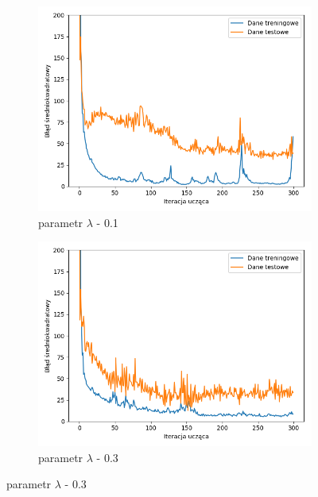 \documentclass[12pt]{aghdpl}
\begin{document}
		\begin{figure}[h]
			\begin{subfigure}{.5\linewidth}
		 		\includegraphics[width =\linewidth]{wykresy/6_regularyzacja/l1/regularyzacja_0_1_wykres_uczenia.png}
		 		\caption{parametr $\lambda$ - 0.1}
		 	\end{subfigure}
		 	\begin{subfigure}{.5\linewidth}
		 		\includegraphics[width =\linewidth]{wykresy/6_regularyzacja/l1/regularyzacja_0_3_wykres_uczenia.png}
		 		\caption{parametr $\lambda$ - 0.3}
		 	\end{subfigure}
		 	

\end{figure}
\end{document}
